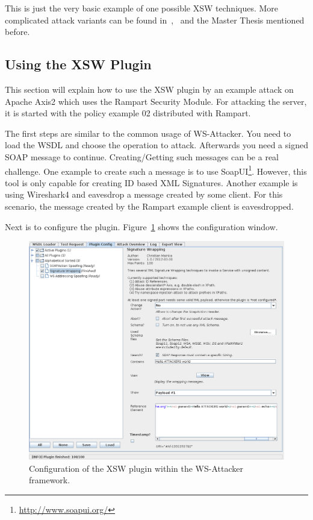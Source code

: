 This is just the very basic example of one possible XSW techniques. More complicated attack variants can be found in~\cite{Liao2011},~\cite{2011:07:xmlSigConSAPSE} and the Master Thesis mentioned before.

\subsection{Using the XSW Plugin}
\label{sec:using_the_xsw_plugin}

This section will explain how to use the XSW plugin by an example attack on Apache Axis2 which uses the Rampart Security Module. 
For attacking the server, it is started with the policy example 02 distributed with Rampart. 

The first steps are similar to the common usage of WS-Attacker. 
You need to load the WSDL and choose the operation to attack. 
Afterwards you need a signed SOAP message to continue. 
Creating/Getting such messages can be a real challenge. 
One example to create such a message is to use SoapUI\footnote{\url{http://www.soapui.org/}}. 
However, this tool is only capable for creating ID based XML Signatures. 
Another example is using Wireshark4 and eavesdrop a message created by some client. 
For this scenario, the message created by the Rampart example client is eavesdropped. 

Next is to configure the plugin. Figure~\ref{fig:xsw_plugin_config} shows the configuration window.

\begin{figure}[ht]
    \begin{center}
        \includegraphics[width=0.9\linewidth]{img/xsw_attacking_axis_with_policy_config}
    \end{center}
    \caption{Configuration of the XSW plugin within the WS-Attacker framework.}
    \label{fig:xsw_plugin_config}
\end{figure}

